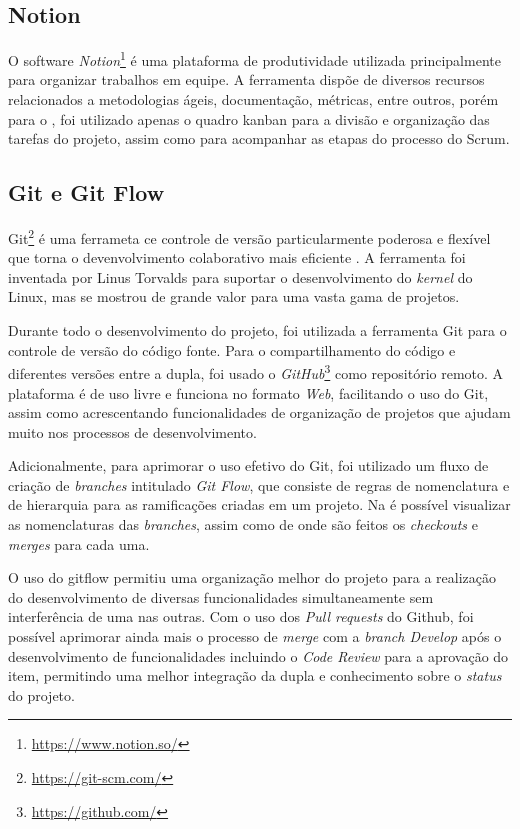 \subsection{Notion}

O software \textit{Notion}\footnote{\url{https://www.notion.so/}} é uma plataforma de produtividade utilizada principalmente para organizar trabalhos em equipe. A ferramenta dispõe de diversos recursos relacionados a metodologias ágeis, documentação, métricas, entre outros, porém para o \appName, foi utilizado apenas o quadro kanban para a divisão e organização das tarefas do projeto, assim como para acompanhar as etapas do processo do Scrum.

\subsection{Git e Git Flow}

Git\footnote{\url{https://git-scm.com/}} é uma ferrameta ce controle de versão particularmente poderosa e flexível que torna o devenvolvimento colaborativo mais eficiente \cite{git}. A ferramenta foi inventada por Linus Torvalds para suportar o desenvolvimento do \textit{kernel} do Linux, mas se mostrou de grande valor para uma vasta gama de projetos.

Durante todo o desenvolvimento do projeto, foi utilizada a ferramenta Git para o controle de versão do código fonte. Para o compartilhamento do código e diferentes versões entre a dupla, foi usado o \textit{GitHub}\footnote{\url{https://github.com/}} como repositório remoto. A plataforma é de uso livre e funciona no formato \textit{Web}, facilitando o uso do Git, assim como acrescentando funcionalidades de organização de projetos que ajudam muito nos processos de desenvolvimento.

Adicionalmente, para aprimorar o uso efetivo do Git, foi utilizado um fluxo de criação de \textit{branches} intitulado \textit{Git Flow}, que consiste de regras de nomenclatura e de hierarquia para as ramificações criadas em um projeto. Na  é possível visualizar as nomenclaturas das \textit{branches}, assim como de onde são feitos os \textit{checkouts} e \textit{merges} para cada uma.


O uso do gitflow permitiu uma organização melhor do projeto para a realização do desenvolvimento de diversas funcionalidades simultaneamente sem interferência de uma nas outras. Com o uso dos \textit{Pull requests} do Github, foi possível aprimorar ainda mais o processo de \textit{merge} com a \textit{branch Develop} após o desenvolvimento de funcionalidades incluindo o \textit{Code Review} para a aprovação do item, permitindo uma melhor integração da dupla e conhecimento sobre o \textit{status} do projeto.

